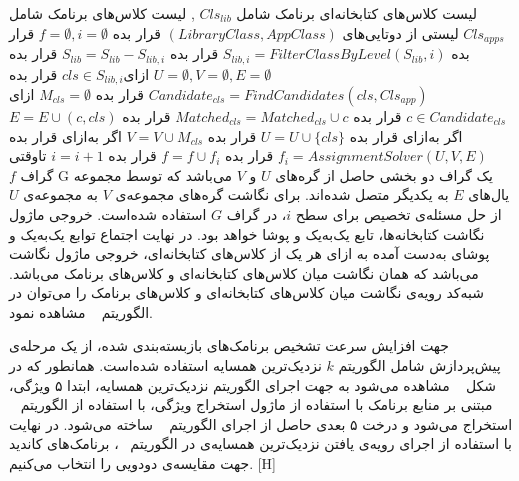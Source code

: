  لیست کلاس‌های کتابخانه‌ای برنامک شامل $Cls_{lib}$ , لیست کلاس‌های برنامک شامل $Cls_{apps}$
 لیستی از دوتایی‌های $(LibraryClass,AppClass)$
 قرار بده $f=\emptyset , i=\emptyset$
 قرار بده $S_{lib,i} = FilterClassByLevel(S_{lib} , i)$
 قرار بده $S_{lib} = S_{lib} - S_{lib,i}$
 قرار بده $U = \emptyset , V = \emptyset , E = \emptyset$
‌ازای{$cls \in S_{lib,i}$}
 قرار بده {$Candidate_{cls} = ‫‪FindCandidates‬‬(cls,Cls_{app})$}
 قرار بده  $M_{cls} = \emptyset$
‌ازای $c \in Candidate_{cls}$
 قرار بده $Matched_{cls}= Matched_{cls} \cup {c}$
 قرار بده $E = E \cup {(c,cls)}$
‌اگر
‌به‌ازای
 قرار بده $U = U \cup \{cls\}$
 قرار بده $V = V \cup M_{cls}$
‌اگر
‌به‌ازای 
 قرار بده {$f_{i} = ‫‪AssignmentSolver‬‬(U,V,E)$}
 قرار بده $f = f \cup f_{i}$
 قرار بده $i=i+1$
‌تاوقتی\\
 $f$
گراف G یک گراف دو بخشی حاصل از گره‌های $U$ و $V$ می‌باشد که توسط مجموعه‌ یال‌های $E$ به یکدیگر متصل شده‌اند. برای نگاشت گره‌های مجموعه‌ی  $V$ به مجموعه‌ی $U$ از حل مسئله‌ی تخصیص برای سطح $i$، در گراف $G$ استفاده شده‌است.  خروجی ماژول نگاشت کتابخانه‌ها، تابع یک‌به‌یک و پوشا‌ خواهد بود. در نهایت اجتماع توابع یک‌به‌یک و پوشای به‌دست آمده به ازای هر یک از کلاس‌های کتابخانه‌ای، خروجی ماژول نگاشت می‌باشد که همان نگاشت میان کلاس‌های کتابخانه‌ای و کلاس‌های برنامک می‌باشد. شبه‌کد رویه‌ی  نگاشت میان کلاس‌های کتابخانه‌ای و کلاس‌های برنامک را می‌توان در الگوریتم ~ مشاهده نمود.

جهت افزایش سرعت تشخیص برنامک‌های بازبسته‌بندی شده، از یک مرحله‌ی پیش‌پردازش شامل الگوریتم $k$ نزدیک‌ترین همسایه استفاده شده‌است. همانطور که در شکل ~ مشاهده می‌شود به جهت اجرای الگوریتم نزدیک‌ترین همسایه، ابتدا ۵ ویژگی، مبتنی بر منابع برنامک با استفاده از ماژول استخراج ویژگی‌، با استفاده از الگوریتم ~ استخراج می‌شود و درخت ۵ بعدی حاصل از اجرای الگوریتم ~ ساخته می‌شود. در نهایت با استفاده از اجرای رویه‌ی یافتن نزدیک‌ترین همسایه‌ی‌ در الگوریتم ~، برنامک‌های کاندید جهت مقایسه‌ی دودویی را انتخاب می‌کنیم.
[H]
\vspace{1em}

